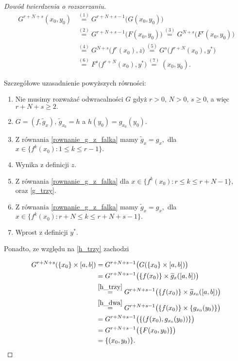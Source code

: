 \documentclass[licencjacka]{pwr_wmat_praca_dyplomowa}
\theoremstyle{plain}
\numberwithin{theorem}{chapter}
\theoremstyle{definition}
\numberwithin{theorem}{chapter}
\begin{document}
\begin{proof}[Dowód twierdzenia o rozszerzaniu]
\begin{equation}
\begin{split}
G^{r+N+s}\left(x_0, y_0\right) & \stackrel{(1)}{=} G^{r+N+s-1}\big(G(x_0, y_0)\big) \\
& \stackrel{(2)}{=} G^{r+N+s-1}\big(F(x_0, y_0)\big) \stackrel{(3)}{=} G^{N+s}\big(F^r(x_0, y_0)\big) \\
& \stackrel{(4)}{=} G^{N+s}\big(f^r(x_0), z\big) \stackrel{(5)}{=} G^s\big(f^{r+N}(x_0), y^*\big) \\
& \stackrel{(6)}{=} F^s\big(f^{r+N}(x_0), y^*\big) \stackrel{(7)}{=} (x_0, y_0).
\end{split}
\end{equation}

Szczegółowe uzasadnienie powyższych równości:
\begin{enumerate}
\item Nie musimy rozważać odwracalności $G$ gdyż $r > 0, \, N > 0, \, s \geq 0$, a więc $r+N+s \geq 2.$
\item $G = (f, \widetilde{g}_x), \, \widetilde{g}_{x_0} = h$ a $h(y_0) = g_{x_0}(y_0).$
\item Z równania \ref{rownanie_g_z_falka} mamy $\widetilde{g}_x = g_x,$ dla $x \in \{f^k(x_0) : 1 \leq k \leq r-1\}.$
\item Wynika z definicji $z.$
\item Z równania \ref{rownanie_g_z_falka} dla $x \in \{f^k(x_0) : r \leq k \leq r+N-1\},$ oraz \ref{g_trzy}.
\item Z równania \ref{rownanie_g_z_falka} mamy $\widetilde{g}_x = g_x,$ dla $x \in \{f^k(x_0) : r+N \leq k \leq r+N+s-1\}.$
\item Wprost z definicji $y^*.$
\end{enumerate}

Ponadto, ze względu na \ref{h_trzy} zachodzi

\begin{equation}
\begin{aligned}
G^{r+N+s}(\{x_0\} \times [a, b]) & = G^{r+N+s-1}\big(G(\{x_0\} \times [a, b])\big) \\
& = G^{r+N+s-1}\big(\{f(x_0)\} \times \widetilde{g}_x([a,b])\big) \\
& \stackrel{\ref{h_trzy}}{=} G^{r+N+s-1}\big(\{f(x_0)\} \times \widetilde{g}_{x_0}([a,b])\big) \\
& \stackrel{\ref{h_dwa}}{=} G^{r+N+s-1}\big(\{f(x_0)\} \times \{g_{x_0}(y_0)\}\big) \\
& = G^{r+N+s-1}\big(\{(f(x_0), g_{x_0}(y_0))\}\big) \\
& = G^{r+N+s-1}\big(\{F(x_0, y_0)\}\big) \\
& = \{(x_0, y_0)\}.
\end{aligned}
\end{equation}



\end{proof}
\end{document}
